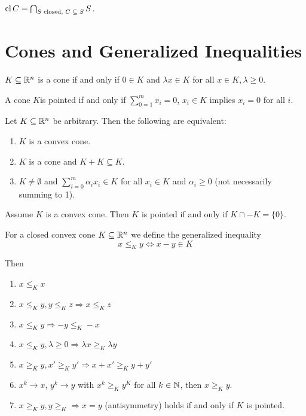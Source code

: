 \begin{thm}
  \label{sec:convexity-17}
  $\operatorname*{cl} C = \bigcap_{\text{$S$ closed, $C \subseteq S$}} S$.
\end{thm}

\section{Cones and Generalized Inequalities}
\label{sec:cones-gener-ineq}

\begin{defn}
  \label{sec:cones-gener-ineq-1}
  $K \subseteq \mathbb{R}^{n}$ is a cone if and only if $0 \in K$ and $\lambda
  x \in K$ for all $x \in K, \lambda \geq 0$.

  A cone $K$is pointed if and only if $\sum_{0=1}^{m} x_{i} = 0$,
  $x_{i} \in K$ implies $x_{i} = 0$ for all $i$.
\end{defn}

\begin{thm}
  \label{sec:cones-gener-ineq-2}
  Let $K \subseteq \mathbb{R}^{n}$ be arbitrary. Then the following are equivalent:
  \begin{enumerate}
  \item $K$ is a convex cone.
  \item $K$ is a cone and $K + K \subseteq K$.
  \item $K \neq \emptyset$ and $\sum_{i=0}^{m} \alpha_{i} x_{i} \in K$
    for all $x_{i} \in K$ and $\alpha_{i} \geq 0$ (not necessarily
    summing to 1).
  \end{enumerate}
\end{thm}

\begin{thm}
  \label{sec:cones-gener-ineq-4}
  Assume $K$ is a convex cone.  Then $K$ is pointed if and only if $K
  \cap -K = \{ 0 \} $.
\end{thm}

\begin{thm}
  \label{sec:cones-gener-ineq-5}
  For a closed convex cone $K \subseteq \mathbb{R}^{n}$ we define the
  generalized inequality
  \begin{equation}
    \label{eq:11}
    x \leq_{K} y \iff x - y \in K
  \end{equation}

  Then
  \begin{enumerate}
  \item $x \leq_{K} x$
  \item $x \leq_{K} y, y \leq_{K} z \Rightarrow x \leq_{K} z$
  \item $x \leq_{K} y \Rightarrow -y \leq_{K} -x$
  \item $x \leq_{K} y, \lambda \geq 0 \Rightarrow \lambda x \geq_{K}
    \lambda y$
  \item $x \geq_{K} y, x' \geq_{K} y' \Rightarrow x + x' \geq_{K} y + y'$
  \item $x^{k} \rightarrow x$, $y^{k} \rightarrow y$ with $x^{k}
    \geq_{K} y^{K}$ for all $k \in \mathbb{N}$, then $x \geq_{K} y$.
  \item $x \geq_{K} y, y \geq_{K} \Rightarrow x = y$ (antisymmetry)
    holds if and only if $K$ is pointed.
  \end{enumerate}
\end{thm}

